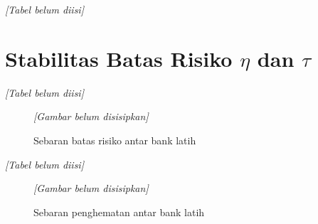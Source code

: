         \begin{table}[H]
            \centering
            \caption{Uji eksak Fisher dan Barnard untuk proporsi kelayakan validasi}\label{tab:fisher}
            \textit{[Tabel belum diisi]}
        \end{table}

    \section{Stabilitas Batas Risiko \texorpdfstring{$\eta$}{eta} dan \texorpdfstring{$\tau$}{tau}}\label{sec:limit stability}

        \begin{table}[H]
            \centering
            \caption{Variabilitas batas risiko antar bank latih dan posisi bank seed 42}\label{tab:limit variability}
            \textit{[Tabel belum diisi]}
        \end{table}

        \begin{figure}[H]
            \centering
            \textit{[Gambar belum disisipkan]}
            \caption{Sebaran batas risiko antar bank latih}\label{fig:limits distribution}
        \end{figure}

        \begin{table}[H]
            \centering
            \caption{Penghematan antar bank latih dibandingkan bank seed 42}\label{tab:savings stability}
            \textit{[Tabel belum diisi]}
        \end{table}

        \begin{figure}[H]
            \centering
            \textit{[Gambar belum disisipkan]}
            \caption{Sebaran penghematan antar bank latih}\label{fig:savings distribution}
        \end{figure}

